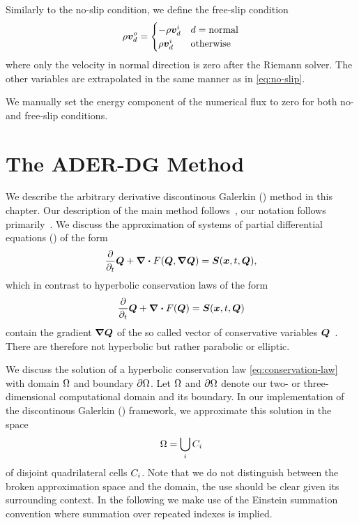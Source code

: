 Similarly to the no-slip condition, we define the free-slip condition
\begin{equation}
  \label{eq:free-slip}
  \rho \bm{v}^o_d = \begin{cases}
    -\rho \bm{v}^i_d & d = \text{normal} \\
    \rho \bm{v}^i_d & \text{otherwise}
    \end{cases}
\end{equation}
where only the velocity in normal direction is zero after the Riemann solver.
The other variables are extrapolated in the same manner as in \cref{eq:no-slip}.

We manually set the energy component of the numerical flux to zero for both no- and free-slip conditions.
\section{The ADER-DG Method}\label{sec:ader-dg}
We describe the arbitrary derivative discontinous Galerkin (\aderdg) method in this chapter.
Our description of the main method follows~\cite{dumbser2008unified,dumbser2010arbitrary,dumbser2018efficient}, our notation follows primarily~\cite{dumbser2018efficient}.
We discuss the approximation of systems of partial differential equations (\pde) of the form
\begin{equation}
  \label{eq:conservation-law-gradient}
 \frac{\partial}{\partial_t}  \Q + \div \flux(\Q, \gradQ) = \source(\bm{x}, t, \Q),
\end{equation}
which in contrast to hyperbolic conservation laws of the form
\begin{equation}
  \label{eq:conservation-law}
 \frac{\partial}{\partial_t}  \Q + \div \flux(\Q) = \source(\bm{x}, t, \Q)
\end{equation}
contain the gradient $\gradQ$ of the so called vector of conservative variables $\bm{Q}$~\cite{dumbser2010arbitrary}.
There are therefore not hyperbolic but rather parabolic or elliptic.

We discuss the solution of a hyperbolic conservation law \cref{eq:conservation-law} with domain $\Omega$ and boundary $\partial \Omega$.
Let $\Omega$ and $\partial \Omega$ denote our two- or three-dimensional computational domain and its boundary.
In our implementation of the discontinous Galerkin (\dg) framework, we approximate this solution in the space
\begin{equation}
  \label{eq:dg-space}
  \Omega = \bigcup_i C_{i}
\end{equation}
of disjoint quadrilateral cells $C_{i}$.
Note that we do not distinguish between the broken approximation space and the domain, the use should be clear given its surrounding context.
In the following we make use of the Einstein summation convention where summation over repeated indexes is implied.

